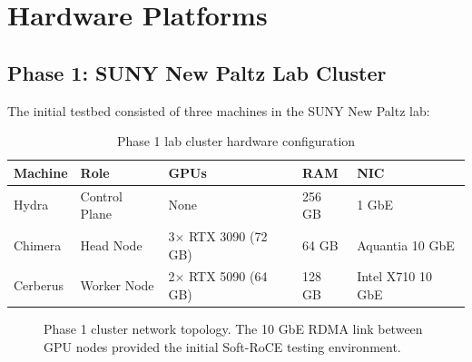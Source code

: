\documentclass[11pt,letterpaper]{article}
\theoremstyle{definition}
\begin{document}
\section{Hardware Platforms}
\label{sec:hardware}

\subsection{Phase 1: SUNY New Paltz Lab Cluster}

The initial testbed consisted of three machines in the SUNY New Paltz lab:

\begin{table}[htbp]
\centering
\caption{Phase 1 lab cluster hardware configuration}
\label{tab:phase1-hardware}
\begin{tabular}{@{}lllll@{}}
\toprule
\textbf{Machine} & \textbf{Role} & \textbf{GPUs} & \textbf{RAM} & \textbf{NIC} \\
\midrule
Hydra & Control Plane & None & 256 GB & 1 GbE \\
Chimera & Head Node & 3$\times$ RTX 3090 (72 GB) & 64 GB & Aquantia 10 GbE \\
Cerberus & Worker Node & 2$\times$ RTX 5090 (64 GB) & 128 GB & Intel X710 10 GbE \\
\bottomrule
\end{tabular}
\end{table}

\begin{figure}[htbp]
\centering
{}
\caption{Phase 1 cluster network topology. The 10 GbE RDMA link between GPU nodes provided the initial Soft-RoCE testing environment.}
\label{fig:phase1-topology}
\end{figure}
\end{document}
